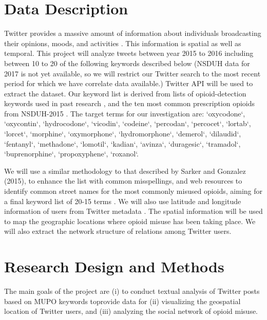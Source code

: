 \documentclass[sigconf]{acmart}
\begin{document}
\section{Data Description} 

Twitter provides a massive amount of information about individuals broadcasting 
their opinions, moods, and activities \cite{widener14}. This information is 
spatial as well as temporal. This project will analyze tweets between year 
2015 to 2016 including between 10 to 20 of the following keywords described
below (NSDUH data for 2017 is not yet available, so we will restrict our 
Twitter search to the most recent period for which we have correlate data 
available.) Twitter API will be used to extract the dataset. Our keyword list 
is derived from lists of opioid-detection keywords used in past research 
\cite{chary17, mackey17, lord11}, and the ten most common prescription opioids 
from NSDUH-2015 \cite{shiverick17}. The target terms for our investigation are: `oxycodone`, `oxycontin`, `hydrocodone`, `vicodin`, `codeine`, `percodan`, 
`percocet`, `lortab`, `lorcet`, `morphine`, `oxymorphone`, `hydromorphone`, 
`demerol`, `dilaudid`, `fentanyl`, `methadone`, `lomotil`, `kadian`, `avinza`, `duragesic`, `tramadol`, `buprenorphine`, `propoxyphene`, `roxanol`.

We will use a similar methodology to that described by Sarker and Gonzalez 
(2015), to enhance the list with common misspellings, and web resources to 
identify common street names for the most commonly misused opioids, aiming 
for a final keyword list of 20-15 terms \cite{sarker17}. We will also use 
latitude and longitude information of users from Twitter metadata 
\cite{twittergeo}. The spatial information will be used to map the geographic 
locations where opioid misuse has been taking place. We will also extract the 
network structure of relations among Twitter users. 


\section{Research Design and Methods}
The main goals of the project are (i) to conduct textual analysis of Twitter 
posts based on MUPO keywords toprovide data for (ii) visualizing the geospatial 
location of Twitter users, and (iii) analyzing the social network of opioid 
misuse.  
\end{document}
